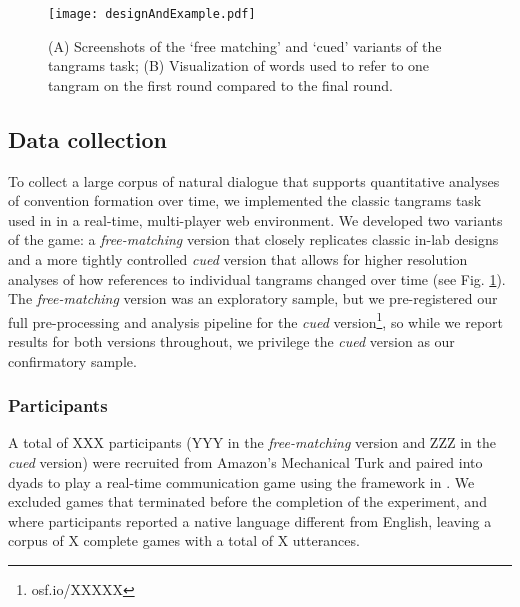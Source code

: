 \begin{figure}
\texttt{[image: designAndExample.pdf]}
\caption[Experimental design and example messages]{(A) Screenshots of the `free matching' and `cued' variants of the tangrams task; (B) Visualization of words used to refer to one tangram on the first round compared to the final round. }
\label{fig:design}
\end{figure}

\subsection{Data collection}

To collect a large corpus of natural dialogue that supports quantitative analyses of convention formation over time, we implemented the classic tangrams task used in \cite{ClarkWilkesGibbs86_ReferringCollaborative} in a real-time, multi-player web environment. 
We developed two variants of the game: a \emph{free-matching} version that closely replicates classic in-lab designs and a more tightly controlled \emph{cued} version that allows for higher resolution analyses of how references to individual tangrams changed over time (see Fig. \ref{fig:design}). 
The \emph{free-matching} version was an exploratory sample, but we pre-registered our full pre-processing and analysis pipeline for the \emph{cued} version\footnote{osf.io/XXXXX}, so while we report results for both versions throughout, we privilege the \emph{cued} version as our confirmatory sample.

\subsubsection{Participants}\label{participants}

A total of XXX participants (YYY in the \emph{free-matching} version and ZZZ in the \emph{cued} version) were recruited from Amazon's Mechanical Turk and paired into dyads to play a real-time communication game using the framework in \cite{Hawkins15_RealTimeWebExperiments}. 
We excluded games that terminated before the completion of the experiment, and where participants reported a native language different from English, leaving a corpus of X complete games with a total of X utterances.

